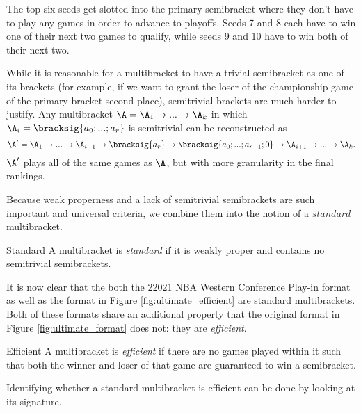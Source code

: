 {    

    The top six seeds get slotted into the primary semibracket where they don't have to play any games in order to advance to playoffs. Seeds 7 and 8 each have to win one of their next two games to qualify, while seeds 9 and 10 have to win both of their next two.

    While it is reasonable for a multibracket to have a trivial semibracket as one of its brackets (for example, if we want to grant the loser of the championship game of the primary bracket second-place), semitrivial brackets are much harder to justify. Any multibracket $\A = \A_1 \to ... \to \A_k$ in which $\A_i = \bracksig{a_0; ...; a_r}$ is semitrivial can be reconstructed as $$\A' = \A_1 \to ... \to \A_{i-1} \to \bracksig{a_r} \to \bracksig{a_0; ...; a_{r-1}; 0} \to \A_{i+1} \to ... \to \A_k.$$ $\A'$ plays all of the same games as $\A$, but with more granularity in the final rankings.

    Because weak properness and a lack of semitrivial semibrackets are such important and universal criteria, we combine them into the notion of a $\textit{standard}$ multibracket.

    \begin{definition}{Standard}{}
        A multibracket is \textit{standard} if it is weakly proper and contains no semitrivial semibrackets.
    \end{definition}

    It is now clear that the both the 22021 NBA Western Conference Play-in format as well as the format in Figure \ref{fig:ultimate_efficient} are standard multibrackets. Both of these formats share an additional property that the original format in Figure \ref{fig:ultimate_format} does not: they are \textit{efficient}.

    \begin{definition}{Efficient}{}
        A multibracket is \textit{efficient} if there are no games played within it such that both the winner and loser of that game are guaranteed to win a semibracket.
    \end{definition}

    Identifying whether a standard multibracket is efficient can be done by looking at its signature.

    }
